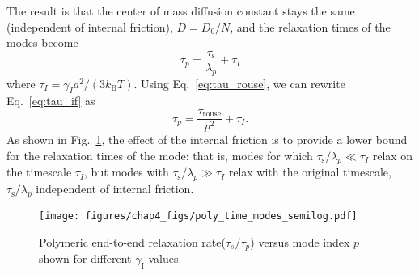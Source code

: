 \documentclass[../talant.diss.submit.tex]{subfiles}
\begin{document}
The result is that the center of
mass diffusion constant stays the same (independent of internal friction),
$D = D_0/N$, and the relaxation times of the modes become
\begin{equation}
  \label{eq:tau_if}
  \tau_p = \frac{\tau_\mathrm{s}}{\lambda_p} + \tau_I
\end{equation}
where $\tau_I = \gamma_I a^2/(3k_\mathrm{B}T)$.
Using Eq.~\ref{eq:tau_rouse}, we can rewrite Eq.~\ref{eq:tau_if} as
%
\begin{equation}
  \label{eq:tau_if2}
     \tau_p = \frac{\tau_\mathrm{rouse}}{p^2} + \tau_I.
\end{equation}   
As shown in Fig.~\ref{fig:poly_time_modes},
the effect of the internal
friction is to provide a lower bound for the relaxation times of the mode:
that is, modes for which $\tau_\mathrm{s}/\lambda_p \ll \tau_I$ relax on the
timescale $\tau_I$, but modes with $\tau_\mathrm{s}/\lambda_p \gg \tau_I$
relax with the original timescale, $\tau_\mathrm{s}/\lambda_p$ independent of
internal friction.

\begin{figure}[htp!]
  \begin{centering}
    \texttt{[image: figures/chap4\_figs/poly\_time\_modes\_semilog.pdf]}
    \caption{Polymeric end-to-end relaxation rate($\tau_s / \tau_p$) versus mode index $p$
    shown for different $\gamma_{\mathrm{I}}$ values.}
    \label{fig:poly_time_modes}
  \end{centering}                                                                                          
\end{figure}                                                                                             
\end{document}
